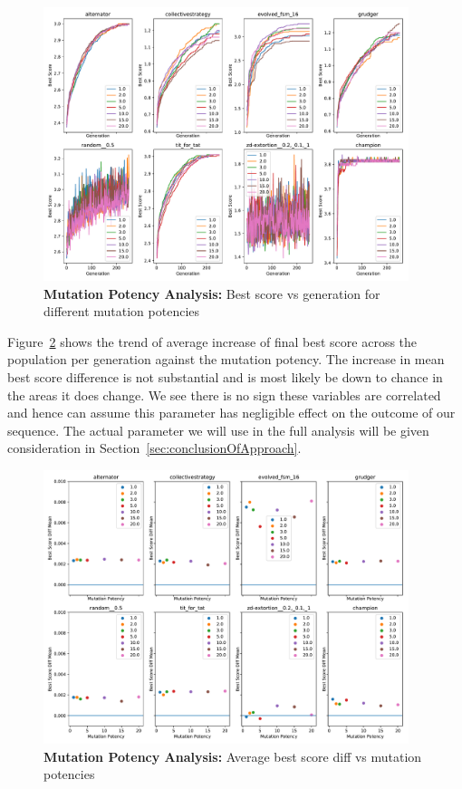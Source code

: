 \begin{figure}[ht]
    \includegraphics[width=0.95\textwidth, keepaspectratio, center]{./img/plots/MUT_POT_bs_v_gen_all.pdf}
    \caption{\textbf{Mutation Potency Analysis:} Best score vs generation for different mutation potencies}\label{fig:MUT-POT-bs-v-gen-all}
\end{figure}

Figure~\ref{fig:MUT-POT-bs-diff-v-pot-all} shows the trend of average increase of final best score across the population per generation against the mutation potency.
The increase in mean best score difference is not substantial and is most likely be down to chance in the areas it does change.
We see there is no sign these variables are correlated and hence can assume this parameter has negligible effect on the outcome of our sequence.
The actual parameter we will use in the full analysis will be given consideration in Section~\ref{sec:conclusionOfApproach}.

\begin{figure}[ht]
    \includegraphics[width=0.95\textwidth, keepaspectratio, center]{./img/plots/MUT_POT_bs_diff_v_pot_all.pdf}
    \caption{\textbf{Mutation Potency Analysis:} Average best score diff vs mutation potencies}\label{fig:MUT-POT-bs-diff-v-pot-all}
\end{figure}


